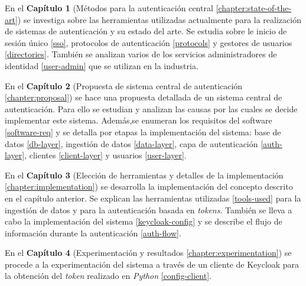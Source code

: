 En el \textbf{Capítulo 1} (Métodos para la autenticación central \ref{chapter:state-of-the-art}) se investiga sobre las herramientas utilizadas actualmente para la realización de sistemas de autenticación y su estado del arte. Se estudia sobre le inicio de sesión único \ref{sso}, protocolos de autenticación \ref{protocols} y gestores de usuarios \ref{directories}. También se analizan varios de los servicios administradores de identidad \ref{user-admin} que se utilizan en la industria.

En el \textbf{Capítulo 2} (Propuesta de sistema central de autenticación \ref{chapter:proposal}) se hace una propuesta detallada de un sistema central de autenticación. Para ello se estudian y analizan las causas por las cuales se decide implementar este sistema. Además,se enumeran los requisitos del software \ref{software-req} y se detalla por etapas la implementación del sistema: base de datos \ref{db-layer}, ingestión de datos \ref{data-layer}, capa de autenticación \ref{auth-layer}, clientes \ref{client-layer} y usuarios \ref{user-layer}.

En el \textbf{Capítulo 3} (Elección de herramientas y detalles de la implementación \ref{chapter:implementation}) se desarrolla la implementación del concepto descrito en el capítulo anterior. Se explican las herramientas utilizadas \ref{tools-used} para la ingestión de datos y para la autenticación basada en \textit{tokens}. También se lleva a cabo la implementación del sistema \ref{keycloak-config} y se describe el flujo de información durante la autenticación \ref{auth-flow}.

En el \textbf{Capítulo 4} (Experimentación y resultados \ref{chapter:experimentation}) se procede a la experimentación del sistema a través de un cliente de Keycloak para la obtención del \textit{token} realizado en \textit{Python} \ref{config-client}.